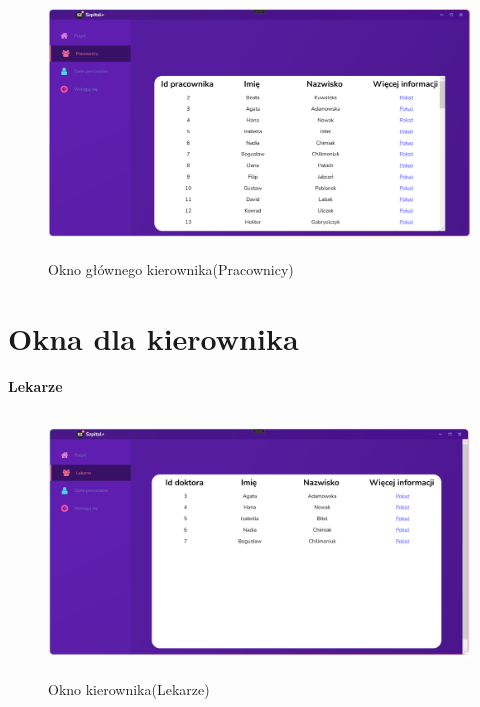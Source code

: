 \begin{figure}[H]
\begin{center}
    \includegraphics[height=7cm]{images/gl_kier_prac.png}
    \caption{Okno głównego kierownika(Pracownicy)}
\end{center}
\end{figure}

\section{Okna dla kierownika}
\Large\textbf{{Lekarze}}

\begin{figure}[H]
\begin{center}
    \includegraphics[height=7cm]{images/kier_lekar.png}
    \caption{Okno kierownika(Lekarze)}
\end{center}
\end{figure}

